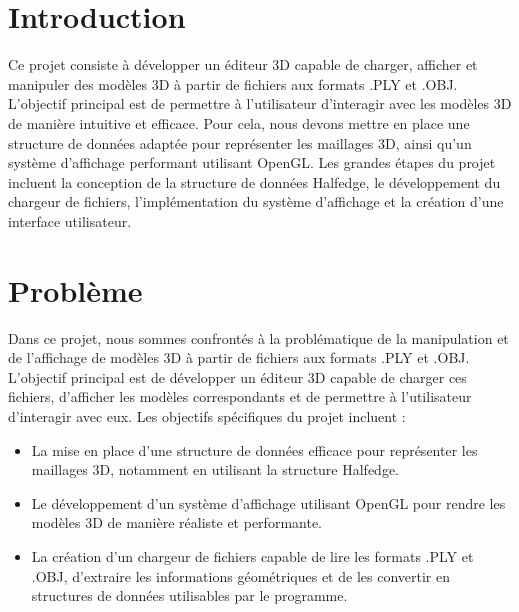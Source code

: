 \documentclass[12pt,a4paper]{article}
\begin{document}

\tableofcontents

\newpage


\section{Introduction}

Ce projet consiste à développer un éditeur 3D capable de charger, afficher et manipuler des modèles 3D à partir de fichiers aux formats .PLY et .OBJ. 
L'objectif principal est de permettre à l'utilisateur d'interagir avec les modèles 3D de manière intuitive et efficace. 
Pour cela, nous devons mettre en place une structure de données adaptée pour représenter les maillages 3D, ainsi qu'un système d'affichage performant utilisant OpenGL. 
Les grandes étapes du projet incluent la conception de la structure de données Halfedge, le développement du chargeur de fichiers, l'implémentation du système d'affichage et la création d'une interface utilisateur.

\section{Problème}

Dans ce projet, nous sommes confrontés à la problématique de la manipulation et de l'affichage de modèles 3D à partir de fichiers aux formats .PLY et .OBJ. L'objectif principal est de développer un éditeur 3D capable de charger ces fichiers, d'afficher les modèles correspondants et de permettre à l'utilisateur d'interagir avec eux. 
Les objectifs spécifiques du projet incluent :
\begin{itemize}
    \item La mise en place d'une structure de données efficace pour représenter les maillages 3D, notamment en utilisant la structure Halfedge.
    \item Le développement d'un système d'affichage utilisant OpenGL pour rendre les modèles 3D de manière réaliste et performante.
    \item La création d'un chargeur de fichiers capable de lire les formats .PLY et .OBJ, d'extraire les informations géométriques et de les convertir en structures de données utilisables par le programme.
\end{itemize}
\end{document}
